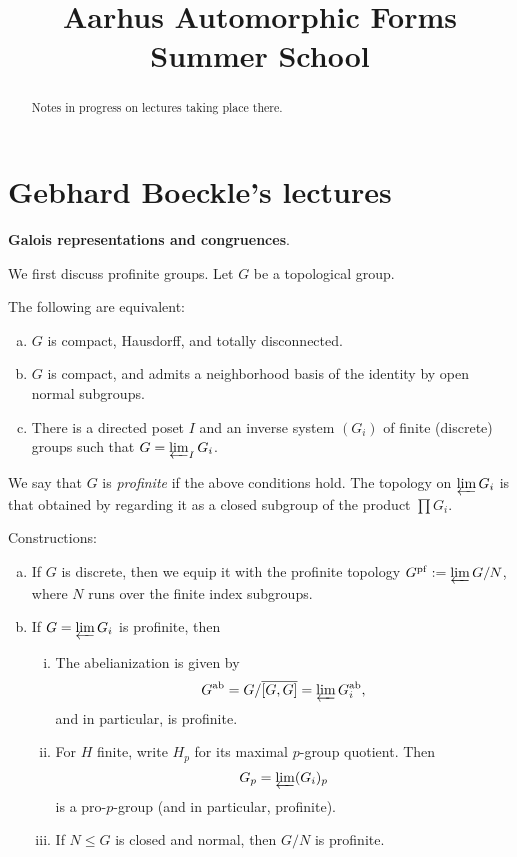 \documentclass[reqno]{amsart} 
\numberwithin{theorem}{section}
\numberwithin{equation}{section}
\numberwithin{exercise}{section}
\begin{document}
\title{Aarhus Automorphic Forms Summer School}

\begin{abstract}
  Notes in progress on lectures taking place there.
\end{abstract}

\section{Gebhard Boeckle's lectures}\label{sec:cq6tho1n9f}
\textbf{Galois representations and congruences}.

We first discuss profinite groups.  Let $G$ be a topological group.

\begin{theorem}\label{theorem:cq6thpngt0}
  The following are equivalent:
  \begin{enumerate}[(a)]
  \item\label{enumerate:cq6r3e8dsb} $G$ is compact, Hausdorff, and totally disconnected.
  \item\label{enumerate:cq6r3e8eqf} $G$ is compact, and admits a neighborhood basis of the identity by open normal subgroups.
  \item\label{enumerate:cq6r3e8f6g} There is a directed poset $I$ and an inverse system $(G_i)$ of finite (discrete) groups such that $G = \varprojlim_I G_i$.
  \end{enumerate}
\end{theorem}
We say that $G$ is \emph{profinite} if the above conditions hold.  The topology on $\varprojlim G_i$ is that obtained by regarding it as a closed subgroup of the product $\prod G_i$.

Constructions:
\begin{enumerate}[(a)]
\item\label{enumerate:cq6r3e8b0y} If $G$ is discrete, then we equip it with the profinite topology $G^{\mathrm{pf}} := \varprojlim G / N$, where $N$ runs over the finite index subgroups.
\item\label{enumerate:cq6r3e8cou} If $G = \varprojlim G_i$ is profinite, then
  \begin{enumerate}[(i)]
  \item\label{enumerate:cq6r3fehbe} The abelianization is given by
    \begin{equation*}
      G^{\mathrm{ab}} = G / \overline{[G, G]} = \varprojlim G_i^{\mathrm{ab}},
    \end{equation*}
    and in particular, is profinite.
  \item\label{enumerate:cq6r3feivc} For $H$ finite, write $H_p$ for its maximal $p$-group quotient.  Then
    \begin{equation*}
      G_p = \varprojlim(G_i)_p
    \end{equation*}
    is a pro-$p$-group (and in particular, profinite).
  \item\label{enumerate:cq6r3fej61} If $N \leq G$ is closed and normal, then $G /N$ is profinite.
  \end{enumerate}
\end{enumerate}
\end{document}
